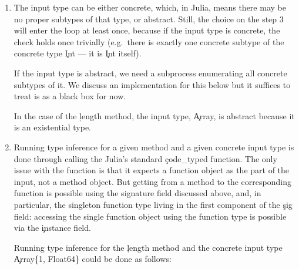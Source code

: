 \begin{enumerate}
  A signature of a method will usually have the special singleton function
  type (\c{typeof(...)}) as the first component, and the rest is (easy to
  convert to) the type of the input --- an $n$-tuple. In this example, the type of
  the input is 1-tuple, consisting of the existential array type
  \c{Array\{T, N\}\ where T where N} abbreviated simply as \c{Array}\footnote{%
A user can always look under the abbreviation using the \c{dump} function.
}.

  \item The input type can be either concrete, which, in Julia, means there may
  be no proper subtypes of that type, or abstract. Still, the choice on the
  step 3 will enter the loop at least once, because if the input type is
  concrete, the check holds once trivially (e.g.\ there is exactly one concrete
  subtype of the concrete type \c{Int} --- it is \c{Int} itself).

  If the input type is abstract, we need a subprocess enumerating all concrete
  subtypes of it. We discuss an implementation for this below but it suffices to
  treat is as a black box for now. %

  In the case of the \c{length} method, the input type, \c{Array}, is abstract
  because it is an existential type.

  \item Running type inference for a given method and a given concrete input
  type is done through calling the Julia's standard \c{code\_typed} function.
  The only issue with the function is that it expects a function object as the
  part of the input, not a method object. But getting from a method to the
  corresponding function is possible using the signature field discussed above,
  and, in particular, the singleton function type living in the first component
  of the \c{sig} field: accessing the single function object using the function
  type is possible via the \c{instance} field.

  Running type inference for the \c{length} method and the concrete input type
  \c{Array\{1, Float64\}} could be done as follows:


\end{enumerate}

